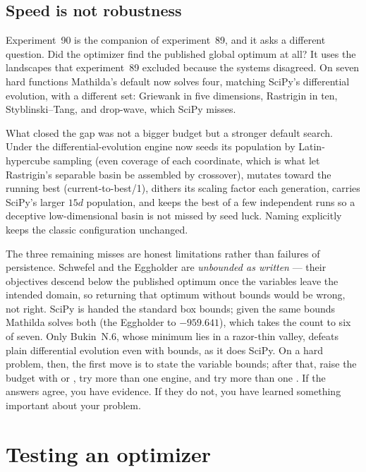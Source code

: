 \subsection{Speed is not robustness}

Experiment~90 is the companion of experiment~89, and it asks a different
question. Did the optimizer find the published global optimum at all? It uses
the landscapes that experiment~89 excluded because the systems disagreed. On
seven hard functions Mathilda's default now solves four, matching SciPy's
differential evolution, with a different set: Griewank in five dimensions,
Rastrigin in ten, Styblinski--Tang, and drop-wave, which SciPy misses.

What closed the gap was not a bigger budget but a stronger default search. Under
 the differential-evolution engine now seeds its
population by Latin-hypercube sampling (even coverage of each coordinate, which
is what let Rastrigin's separable basin be assembled by crossover), mutates
toward the running best (current-to-best/1), dithers its scaling factor each
generation, carries SciPy's larger \(15d\) population, and keeps the best of a few
independent runs so a deceptive low-dimensional basin is not missed by seed luck.
Naming  explicitly keeps the classic configuration
unchanged.

The three remaining misses are honest limitations rather than failures of
persistence. Schwefel and the Eggholder are \emph{unbounded as written} --- their
objectives descend below the published optimum once the variables leave the
intended domain, so returning that optimum without bounds would be wrong, not
right. SciPy is handed the standard box bounds; given the same bounds Mathilda
solves both (the Eggholder to \(-959.641\)), which takes the count to six of
seven. Only Bukin~N.6, whose minimum lies in a razor-thin valley, defeats plain
differential evolution even with bounds, as it does SciPy. On a hard problem,
then, the first move is to state the variable bounds; after that, raise the budget
with  or , try more than one engine,
and try more than one . If the answers agree, you have
evidence. If they do not, you have learned something important about your problem.

\section{Testing an optimizer}
\label{sec:opt-testing}

